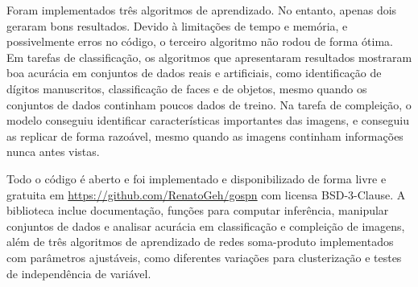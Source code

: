 \documentclass[12pt]{article}
\theoremstyle{plain}
\numberwithin{equation}{section}
\begin{document}
Foram implementados três algoritmos de aprendizado. No entanto, apenas dois geraram bons
resultados. Devido à limitações de tempo e memória, e possivelmente erros no código, o terceiro
algoritmo não rodou de forma ótima. Em tarefas de classificação, os algoritmos que apresentaram
resultados mostraram boa acurácia em conjuntos de dados reais e artificiais, como identificação de
dígitos manuscritos, classificação de faces e de objetos, mesmo quando os conjuntos de dados
continham poucos dados de treino. Na tarefa de compleição, o modelo conseguiu identificar
características importantes das imagens, e conseguiu as replicar de forma razoável, mesmo quando as
imagens continham informações nunca antes vistas.

Todo o código é aberto e foi implementado e disponibilizado de forma livre e gratuita em
\url{https://github.com/RenatoGeh/gospn} com licensa BSD-3-Clause. A biblioteca inclue
documentação, funções para computar inferência, manipular conjuntos de dados e analisar acurácia em
classificação e compleição de imagens, além de três algoritmos de aprendizado de redes soma-produto
implementados com parâmetros ajustáveis, como diferentes variações para clusterização e testes de
independência de variável.

\printbibliography[]
\end{document}
